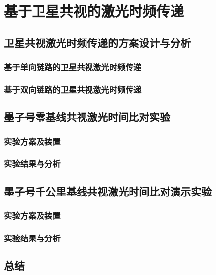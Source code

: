 \chapter{基于卫星共视的激光时频传递}

\section{卫星共视激光时频传递的方案设计与分析}
\subsection{基于单向链路的卫星共视激光时频传递}
\subsection{基于双向链路的卫星共视激光时频传递}

\section{墨子号零基线共视激光时间比对实验}
\subsection{实验方案及装置}
\subsection{实验结果与分析}

\section{墨子号千公里基线共视激光时间比对演示实验}
\subsection{实验方案及装置}
\subsection{实验结果与分析}

\section{总结}
